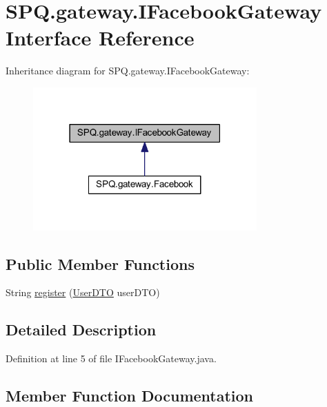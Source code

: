 \hypertarget{interface_s_p_q_1_1gateway_1_1_i_facebook_gateway}{}\section{S\+P\+Q.\+gateway.\+I\+Facebook\+Gateway Interface Reference}
\label{interface_s_p_q_1_1gateway_1_1_i_facebook_gateway}


Inheritance diagram for S\+P\+Q.\+gateway.\+I\+Facebook\+Gateway\+:
\nopagebreak
\begin{figure}[H]
\begin{center}
\leavevmode
\includegraphics[width=243pt]{interface_s_p_q_1_1gateway_1_1_i_facebook_gateway__inherit__graph}
\end{center}
\end{figure}
\subsection*{Public Member Functions}
\begin{DoxyCompactItemize}
\item 
String \mbox{\hyperlink{interface_s_p_q_1_1gateway_1_1_i_facebook_gateway_adeef42315d68dc80ddf79bf4e1cbdeb0}{register}} (\mbox{\hyperlink{class_s_p_q_1_1dto_1_1_user_d_t_o}{User\+D\+TO}} user\+D\+TO)
\end{DoxyCompactItemize}


\subsection{Detailed Description}


Definition at line 5 of file I\+Facebook\+Gateway.\+java.



\subsection{Member Function Documentation}
\mbox{\label{interface_s_p_q_1_1gateway_1_1_i_facebook_gateway_adeef42315d68dc80ddf79bf4e1cbdeb0}} 
